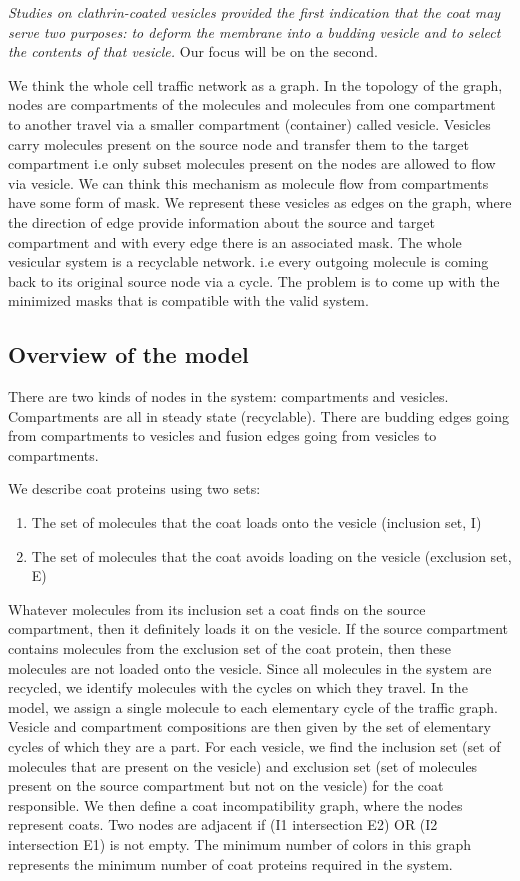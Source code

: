 \documentclass[preprint,12pt]{elsarticle}
\begin{document}
\textit{Studies on clathrin-coated vesicles provided the first indication that the coat may serve two purposes: to deform the membrane into a budding vesicle and to select the contents of that vesicle.} Our focus will be on the second. 

We think the whole cell traffic network as a graph. In the topology of the graph, nodes are compartments of the molecules and molecules from one compartment to another travel via a smaller compartment (container) called vesicle. Vesicles carry molecules present on the source node and transfer them to the target compartment i.e only subset molecules present on the nodes are allowed to flow via vesicle. We can think this mechanism as molecule flow from compartments have some form of mask. We represent these vesicles as edges on the graph, where the direction of edge provide information about the source and target compartment and with every edge there is an associated mask. The whole vesicular system is a recyclable network. i.e every outgoing molecule is coming back to its original source node via a cycle. The problem is to come up with the minimized masks that is compatible with the valid system. 

\subsection{Overview of the model} There are two kinds of nodes in the system: compartments and vesicles. Compartments are all in steady state (recyclable). There are budding edges going from compartments to vesicles and fusion edges going from vesicles to compartments.

We describe coat proteins using two sets:
\begin{enumerate}
\item The set of molecules that the coat loads onto the vesicle (inclusion set, I)
\item The set of molecules that the coat avoids loading on the vesicle (exclusion set, E) 
\end{enumerate}

Whatever molecules from its inclusion set a coat finds on the source compartment, then it definitely loads it on the vesicle. If the source compartment contains molecules from the exclusion set of the
coat protein, then these molecules are not loaded onto the vesicle.
Since all molecules in the system are recycled, we identify molecules with the cycles on which they travel. In the model, we assign a single molecule to each elementary cycle of the traffic graph. Vesicle and compartment compositions are then given by the set of elementary cycles of which they are a part.
For each vesicle, we find the inclusion set (set of molecules that are present on the vesicle) and exclusion set (set of molecules present on the source compartment but not on the vesicle) for the
coat responsible.
We then define a coat incompatibility graph, where the nodes represent coats. Two nodes are adjacent if (I1 intersection E2) OR (I2 intersection E1) is not empty. The minimum number of colors in this graph represents the minimum number of coat proteins required in the system.
\end{document}
